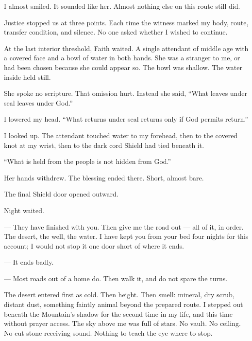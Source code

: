 I almost smiled. It sounded like her. Almost nothing else on this route still did.\par

Justice stopped us at three points. Each time the witness marked my body, route, transfer condition, and silence. No one asked whether I wished to continue.\par

At the last interior threshold, Faith waited. A single attendant of middle age with a covered face and a bowl of water in both hands. She was a stranger to me, or had been chosen because she could appear so. The bowl was shallow. The water inside held still.\par

She spoke no scripture. That omission hurt. Instead she said, ``What leaves under seal leaves under God.''\par

I lowered my head. ``What returns under seal returns only if God permits return.''\par

I looked up. The attendant touched water to my forehead, then to the covered knot at my wrist, then to the dark cord Shield had tied beneath it.\par

``What is held from the people is not hidden from God.''\par

Her hands withdrew. The blessing ended there. Short, almost bare.\par

The final Shield door opened outward.\par

Night waited.\par

\ornament

\begin{room}

--- They have finished with you. Then give me the road out --- all of it, in order. The desert, the well, the water. I have kept you from your bed four nights for this account; I would not stop it one door short of where it ends.

--- It ends badly.

--- Most roads out of a home do. Then walk it, and do not spare the turns.

\end{room}

\ornament

The desert entered first as cold. Then height. Then smell: mineral, dry scrub, distant dust, something faintly animal beyond the prepared route. I stepped out beneath the Mountain's shadow for the second time in my life, and this time without prayer access. The sky above me was full of stars. No vault. No ceiling. No cut stone receiving sound. Nothing to teach the eye where to stop.\par

